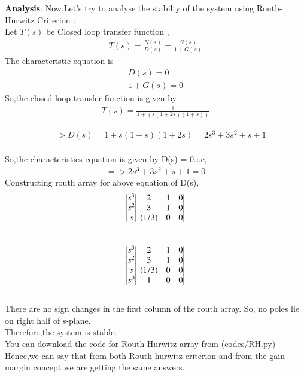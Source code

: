 \begin{enumerate}[label=\thesection.\arabic*.,ref=\thesection.\theenumi]
\textbf{Analysis}:
Now,Let's try to analyse the stabilty of the system using Routh-Hurwitz Criterion :
\\

Let $T(s)$ be Closed loop transfer function ,
\begin{align}
T(s)=\frac{N(s)}{D(s)}=\frac{G(s)}{1+G(s)}
\end{align}
The characteristic equation is 
\begin{align}
D(s)=0  \\
1+G(s)=0 
\end{align}
So,the closed loop transfer function is given by 
\begin{align}
T(s) = \frac{1}{1 + (s(1+2s)(1+s))}
\end{align}

\begin{align}
=> D(s) = 1 + s(1+s)(1+2s) = 2s^3 + 3s^2 + s + 1 
\end{align}
\\
So,the characteristics equation is given by D(s) = 0.i.e,
\begin{align}
=> 2s^3 + 3s^2 + s + 1 = 0 
\end{align}
Constructing routh array for above equation of D(s),
\begin{align}
\begin{vmatrix}s^3\\s^2\\s\end{vmatrix}
\begin{vmatrix}2 & 1 & 0 \\ 3 & 1 & 0 \\ (1/3) & 0 & 0\end{vmatrix}
\end{align}\\

\begin{align}
\begin{vmatrix}s^3\\s^2\\s\\s^0\end{vmatrix}
\begin{vmatrix}2 & 1 & 0 \\ 3 & 1 & 0 \\ (1/3) & 0 & 0 \\ 1 & 0 & 0\end{vmatrix}
\end{align}\\


There are no sign changes in the first column of the routh array. So, no poles lie on right half of s-plane. 
\\
Therefore,the system is stable.\\

You can download the code for Routh-Hurwitz array from (codes/RH.py)
\\

Hence,we can say that from both Routh-hurwitz criterion and from the gain margin concept we are getting the same answers.

\end{enumerate}



